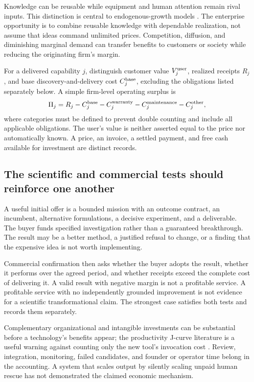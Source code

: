 \documentclass[11pt,letterpaper]{article}
\newcommand{\1}{\mathbf 1}
\theoremstyle{remark}\newtheorem{remark}{Remark}[section]
\begin{document}
Knowledge can be reusable while equipment and human attention remain rival inputs. This distinction is central to endogenous-growth models \citep{romer}. The enterprise opportunity is to combine reusable knowledge with dependable realization, not assume that ideas command unlimited prices. Competition, diffusion, and diminishing marginal demand can transfer benefits to customers or society while reducing the originating firm's margin.

For a delivered capability $j$, distinguish customer value $V_j^{\rm user}$, realized receipts $R_j$, and base discovery-and-delivery cost $C_j^{\rm base}$, excluding the obligations listed separately below. A simple firm-level operating surplus is
\begin{equation}\label{eq:margin}
 \Pi_j=R_j-C_j^{\rm base}-C_j^{\rm warranty}-C_j^{\rm maintenance}-C_j^{\rm other},
\end{equation}
where categories must be defined to prevent double counting and include all applicable obligations. The user's value is neither asserted equal to the price nor automatically known. A price, an invoice, a settled payment, and free cash available for investment are distinct records.

\subsection{The scientific and commercial tests should reinforce one another}
A useful initial offer is a bounded mission with an outcome contract, an incumbent, alternative formulations, a decisive experiment, and a deliverable. The buyer funds specified investigation rather than a guaranteed breakthrough. The result may be a better method, a justified refusal to change, or a finding that the expensive idea is not worth implementing.

Commercial confirmation then asks whether the buyer adopts the result, whether it performs over the agreed period, and whether receipts exceed the complete cost of delivering it. A valid result with negative margin is not a profitable service. A profitable service with no independently grounded improvement is not evidence for a scientific transformational claim. The strongest case satisfies both tests and records them separately.

Complementary organizational and intangible investments can be substantial before a technology's benefits appear; the productivity J-curve literature is a useful warning against counting only the new tool's invocation cost \citep{jcurve}. Review, integration, monitoring, failed candidates, and founder or operator time belong in the accounting. A system that scales output by silently scaling unpaid human rescue has not demonstrated the claimed economic mechanism.
\end{document}
